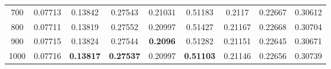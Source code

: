 \documentclass[Journal]{ascelike}
\begin{document}
\begin{table}[htbp]
\begin{center}
\begin{tabular}{l|l|l|l|l|l|l|l|l}
\multicolumn{1}{c|}{700} & \multicolumn{1}{c|}{0.07713} & \multicolumn{1}{c|}{0.13842} & \multicolumn{1}{c|}{0.27543} & \multicolumn{1}{c|}{0.21031} & \multicolumn{1}{c|}{0.51183} & \multicolumn{1}{c|}{0.2117} & \multicolumn{1}{c|}{0.22667} & \multicolumn{1}{c}{0.30612} \\ 
\multicolumn{1}{c|}{800} & \multicolumn{1}{c|}{0.07711} & \multicolumn{1}{c|}{0.13819} & \multicolumn{1}{c|}{0.27552} & \multicolumn{1}{c|}{0.20997} & \multicolumn{1}{c|}{0.51427} & \multicolumn{1}{c|}{0.21167} & \multicolumn{1}{c|}{0.22668} & \multicolumn{1}{c}{0.30704} \\ 
\multicolumn{1}{c|}{900} & \multicolumn{1}{c|}{0.07715} & \multicolumn{1}{c|}{0.13824} & \multicolumn{1}{c|}{0.27544} & \multicolumn{1}{c|}{\textbf{0.2096}} & \multicolumn{1}{c|}{0.51282} & \multicolumn{1}{c|}{0.21151} & \multicolumn{1}{c|}{0.22645} & \multicolumn{1}{c}{0.30671} \\ 
\multicolumn{1}{c|}{1000} & \multicolumn{1}{c|}{0.07716} & \multicolumn{1}{c|}{\textbf{0.13817}} & \multicolumn{1}{c|}{\textbf{0.27537}} & \multicolumn{1}{c|}{0.20997} & \multicolumn{1}{c|}{\textbf{0.51103}} & \multicolumn{1}{c|}{0.21146} & \multicolumn{1}{c|}{0.22656} & \multicolumn{1}{c}{0.30739} \\ 
\hline
\end{tabular}
\label{table5}
\end{center}
\end{table}
\end{document}
